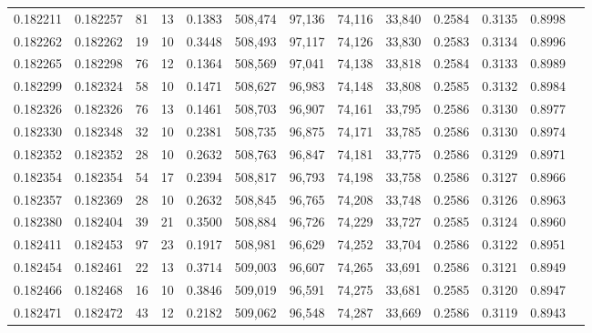\begin{tabular}{rrrrrrrrrrrrr}
0.182211 & 0.182257 &    81 &  13 &                                     0.1383 & 508,474 &  97,136 &  74,116 &  33,840 & 0.2584 & 0.3135 & 0.8998 \\
0.182262 & 0.182262 &    19 &  10 &                                     0.3448 & 508,493 &  97,117 &  74,126 &  33,830 & 0.2583 & 0.3134 & 0.8996 \\
0.182265 & 0.182298 &    76 &  12 &                                     0.1364 & 508,569 &  97,041 &  74,138 &  33,818 & 0.2584 & 0.3133 & 0.8989 \\
0.182299 & 0.182324 &    58 &  10 &                                     0.1471 & 508,627 &  96,983 &  74,148 &  33,808 & 0.2585 & 0.3132 & 0.8984 \\
0.182326 & 0.182326 &    76 &  13 &                                     0.1461 & 508,703 &  96,907 &  74,161 &  33,795 & 0.2586 & 0.3130 & 0.8977 \\
0.182330 & 0.182348 &    32 &  10 &                                     0.2381 & 508,735 &  96,875 &  74,171 &  33,785 & 0.2586 & 0.3130 & 0.8974 \\
0.182352 & 0.182352 &    28 &  10 &                                     0.2632 & 508,763 &  96,847 &  74,181 &  33,775 & 0.2586 & 0.3129 & 0.8971 \\
0.182354 & 0.182354 &    54 &  17 &                                     0.2394 & 508,817 &  96,793 &  74,198 &  33,758 & 0.2586 & 0.3127 & 0.8966 \\
0.182357 & 0.182369 &    28 &  10 &                                     0.2632 & 508,845 &  96,765 &  74,208 &  33,748 & 0.2586 & 0.3126 & 0.8963 \\
0.182380 & 0.182404 &    39 &  21 &                                     0.3500 & 508,884 &  96,726 &  74,229 &  33,727 & 0.2585 & 0.3124 & 0.8960 \\
0.182411 & 0.182453 &    97 &  23 &                                     0.1917 & 508,981 &  96,629 &  74,252 &  33,704 & 0.2586 & 0.3122 & 0.8951 \\
0.182454 & 0.182461 &    22 &  13 &                                     0.3714 & 509,003 &  96,607 &  74,265 &  33,691 & 0.2586 & 0.3121 & 0.8949 \\
0.182466 & 0.182468 &    16 &  10 &                                     0.3846 & 509,019 &  96,591 &  74,275 &  33,681 & 0.2585 & 0.3120 & 0.8947 \\
0.182471 & 0.182472 &    43 &  12 &                                     0.2182 & 509,062 &  96,548 &  74,287 &  33,669 & 0.2586 & 0.3119 & 0.8943 \\

\end{tabular}
